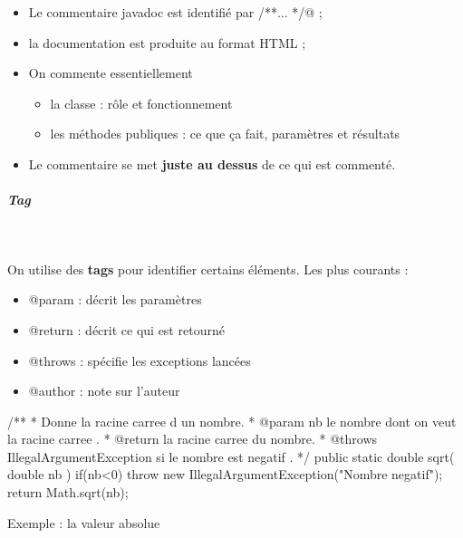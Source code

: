 \documentclass[11pt,a4paper]{article}
\begin{document}
					\begin{itemize}
				
			\item Le commentaire javadoc est identifi\'e par \verb@/**... */@ ;
			\item la documentation est produite au format HTML ;
			\item On commente essentiellement
            
					\begin{itemize}
				
			\item la classe : r\^ole et fonctionnement
			\item les m\'ethodes publiques : ce que \c ca fait, param\`etres et r\'esultats
					\end{itemize}
				
			\item Le commentaire se met \textbf{juste au dessus} de ce qui est comment\'e.
					\end{itemize}
				
            \par
        
			
		\subparagraph{Tag} 
		
					\textcolor{white}{.} \par
				
		    On utilise des \textbf{tags} pour identifier certains \'el\'ements.
		    Les plus courants :
		    
					\begin{itemize}
				
			\item @param : d\'ecrit les param\`etres
			\item @return : d\'ecrit ce qui est retourn\'e
			\item @throws : sp\'ecifie les exceptions lanc\'ees
			\item @author : note sur l'auteur
					\end{itemize}
				
            \par
        \begin{Java}

/**
* Donne la racine carree d un nombre.
* @param nb le nombre dont on veut la racine carree .
* @return la racine carree du nombre.
* @throws IllegalArgumentException si le nombre est negatif .
*/
public static double sqrt( double nb ) {
    if(nb<0) {
      throw new IllegalArgumentException("Nombre negatif");
    }
    return Math.sqrt(nb);
}				\end{Java}
		    Exemple : la valeur absolue
      
\end{document}
